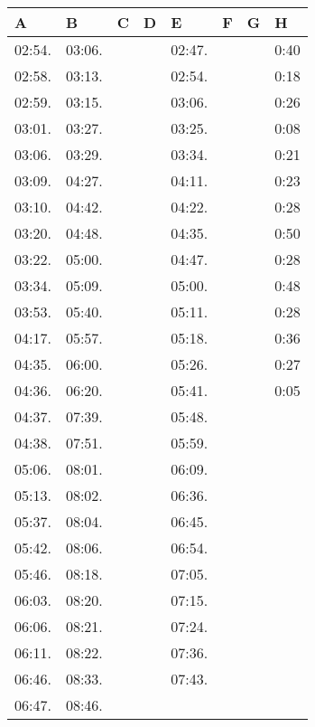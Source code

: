 \documentclass{mcmthesis}
\begin{document}
\begin{appendices}
\begin{table}[htbp]
\begin{tabular}{m{1.3cm}<{\centering}m{1.3cm}<{\centering}m{1.3cm}<{\centering}m{1.3cm}<{\centering}m{1.3cm}<{\centering}m{1.3cm}<{\centering}m{1.3cm}<{\centering}m{1.3cm}<{\centering}}
\bottomrule
\end{tabular}
\end{table}
\begin{table}[htbp]
\centering
\begin{tabular}{m{1.3cm}<{\centering}m{1.3cm}<{\centering}m{1.3cm}<{\centering}m{1.3cm}<{\centering}m{1.3cm}<{\centering}m{1.3cm}<{\centering}m{1.3cm}<{\centering}m{1.3cm}<{\centering}}
\toprule
\textbf{A}&\textbf{B}&\textbf{C}&\textbf{D}&\textbf{E}&\textbf{F}&\textbf{G}&\textbf{H}\\
\midrule
02:54.&	03:06.&		&		&	02:47.&		&		&	0:40\\
02:58.&	03:13.&		&		&	02:54.&		&		&	0:18\\
02:59.&	03:15.&		&		&	03:06.&		&		&	0:26\\
03:01.&	03:27.&		&		&	03:25.&		&		&	0:08\\
03:06.&	03:29.&		&		&	03:34.&		&		&	0:21\\
03:09.&	04:27.&		&		&	04:11.&		&		&	0:23\\
03:10.&	04:42.&		&		&	04:22.&		&		&	0:28\\
03:20.&	04:48.&		&		&	04:35.&		&		&	0:50\\
03:22.&	05:00.&		&		&	04:47.&		&		&	0:28\\
03:34.&	05:09.&		&		&	05:00.&		&		&	0:48\\
03:53.&	05:40.&		&		&	05:11.&		&		&	0:28\\
04:17.&	05:57.&		&		&	05:18.&		&		&	0:36\\
04:35.&	06:00.&		&		&	05:26.&		&		&	0:27\\
04:36.&	06:20.&		&		&	05:41.&		&		&	0:05\\
04:37.&	07:39.&		&		&	05:48.&&&\\		
04:38.&	07:51.&		&		&	05:59.&&&\\			
05:06.&	08:01.&		&		&	06:09.&&&\\			
05:13.&	08:02.&		&		&	06:36.&&&\\			
05:37.&	08:04.&		&		&	06:45.&&&\\			
05:42.&	08:06.&		&		&	06:54.&&&\\		
05:46.&	08:18.&		&		&	07:05.&&&\\			
06:03.&	08:20.&		&		&	07:15.&&&\\			
06:06.&	08:21.&		&		&	07:24.&&&\\			
06:11.&	08:22.&		&		&	07:36.&&&\\			
06:46.&	08:33.&		&		&	07:43.&&&\\		
06:47.&	08:46.&&&&&&\\						

\end{tabular}
\end{table}
\end{appendices}
\end{document}
